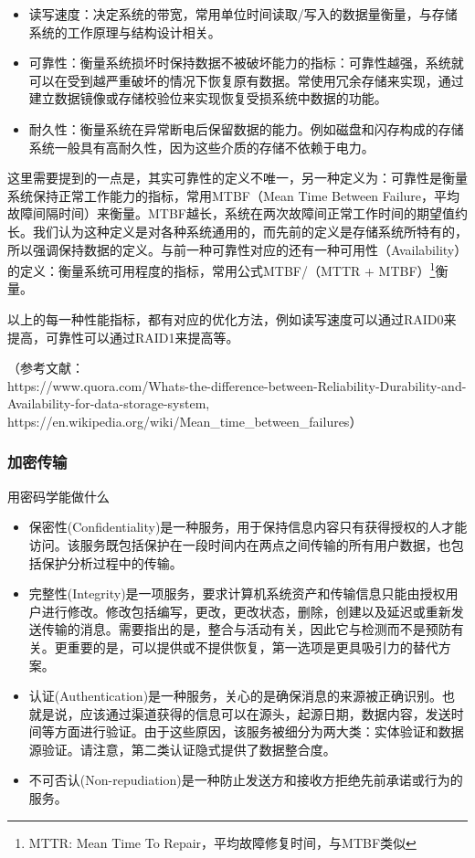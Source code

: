 \documentclass{ctexart}
\begin{document}
\begin{itemize}
    \item 读写速度：决定系统的带宽，常用单位时间读取/写入的数据量衡量，与存储系统的工作原理与结构设计相关。
    \item 可靠性：衡量系统损坏时保持数据不被破坏能力的指标：可靠性越强，系统就可以在受到越严重破坏的情况下恢复原有数据。常使用冗余存储来实现，通过建立数据镜像或存储校验位来实现恢复受损系统中数据的功能。
    \item 耐久性：衡量系统在异常断电后保留数据的能力。例如磁盘和闪存构成的存储系统一般具有高耐久性，因为这些介质的存储不依赖于电力。
\end{itemize}

这里需要提到的一点是，其实可靠性的定义不唯一，另一种定义为：可靠性是衡量系统保持正常工作能力的指标，常用MTBF（Mean Time Between Failure，平均故障间隔时间）来衡量。MTBF越长，系统在两次故障间正常工作时间的期望值约长。我们认为这种定义是对各种系统通用的，而先前的定义是存储系统所特有的，所以强调保持数据的定义。与前一种可靠性对应的还有一种可用性（Availability）的定义：衡量系统可用程度的指标，常用公式MTBF/（MTTR + MTBF）\footnote{MTTR: Mean Time To Repair，平均故障修复时间，与MTBF类似}衡量。

以上的每一种性能指标，都有对应的优化方法，例如读写速度可以通过RAID0来提高，可靠性可以通过RAID1来提高等。

（参考文献：\\
https://www.quora.com/Whats-the-difference-between-Reliability-Durability-and-Availability-for-data-storage-system, \\ https://en.wikipedia.org/wiki/Mean\_time\_between\_failures）

\subsubsection{加密传输}
用密码学能做什么
\begin{itemize}
	\item 保密性(Confidentiality)是一种服务，用于保持信息内容只有获得授权的人才能访问。该服务既包括保护在一段时间内在两点之间传输的所有用户数据，也包括保护分析过程中的传输。
	\item 完整性(Integrity)是一项服务，要求计算机系统资产和传输信息只能由授权用户进行修改。修改包括编写，更改，更改状态，删除，创建以及延迟或重新发送传输的消息。需要指出的是，整合与活动有关，因此它与检测而不是预防有关。更重要的是，可以提供或不提供恢复，第一选项是更具吸引力的替代方案。
	\item 认证(Authentication)是一种服务，关心的是确保消息的来源被正确识别。也就是说，应该通过渠道获得的信息可以在源头，起源日期，数据内容，发送时间等方面进行验证。由于这些原因，该服务被细分为两大类：实体验证和数据源验证。请注意，第二类认证隐式提供了数据整合度。
	\item 不可否认(Non-repudiation)是一种防止发送方和接收方拒绝先前承诺或行为的服务。
\end{itemize}
\end{document}
